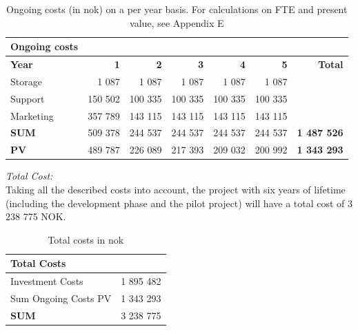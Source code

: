 \begin{table}
\centering
\caption[Ongoing costs on a per year basis]{Ongoing costs (in \ac{nok}) on a per year basis. For calculations on FTE and present value, see Appendix E}
    \begin{tabular}{|l|r|r|r|r|r|r|}
        \hline
       \textbf{Ongoing costs}  & & & & & & \\ \hline
      \textbf{Year} & \textbf{1} & \textbf{2} & \textbf{3} & \textbf{4} & \textbf{5} & \textbf{Total}\\ \hline
	   Storage & 1 087 & 1 087 & 1 087 & 1 087 & 1 087 &\\ \hline
	  Support & 150 502 & 100 335 & 100 335 & 100 335 & 100 335 & \\ \hline
	  Marketing & 357 789 & 143 115 & 143 115 & 143 115 & 143 115 & \\ \hline
	   \textbf{SUM} & 509 378 & 244 537 & 244 537 & 244 537 & 244 537 & \textbf{1 487 526} \\ \hline  
	   \textbf{PV} & 489 787 & 226 089 & 217 393 & 209 032 & 200 992 & \textbf{1 343 293}  \\ \hline
    \end{tabular}
    \label{tab:ongoing}
\end{table}
\emph{Total Cost:}\\
Taking all the described costs into account, the project with six years of lifetime (including the development phase and the pilot project) will have a total cost of 3 238 775 NOK.

\begin{table}[h]
\centering
\caption[Total costs]{Total costs in \ac{nok}}
\begin{tabular}{|l|r|}
\hline
\textbf{Total Costs} & \\ \hline
Investment Costs & 1 895 482 \\ \hline
Sum Ongoing Costs PV & 1 343 293 \\ \hline
\textbf{SUM} & 3 238 775 \\ \hline
\end{tabular}
\label{tab:totalcosts}
\end{table}

